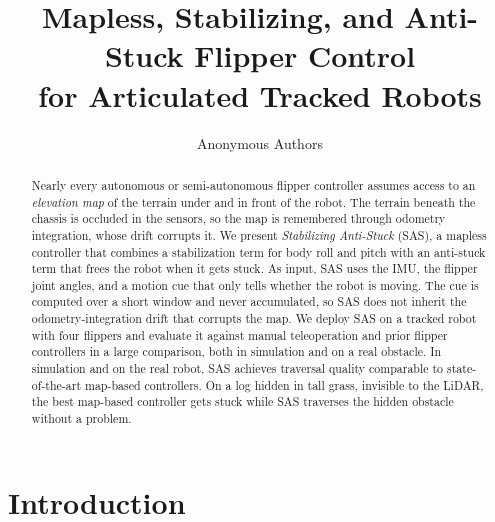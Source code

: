 \documentclass[letterpaper, 10pt, conference]{ieeeconf}
\newcommand{\SAS}{SAS}                    %
\begin{document}
\title{Mapless, Stabilizing, and Anti-Stuck Flipper Control\\ for Articulated Tracked Robots}

\author{Anonymous Authors}

\maketitle

\begin{abstract}
Nearly every autonomous or semi-autonomous flipper controller assumes access
to an \emph{elevation map} of the terrain under and in front of the robot. The terrain beneath the chassis is occluded in the sensors, so the map is remembered through odometry integration, whose drift corrupts it. We present
\emph{Stabilizing Anti-Stuck} (\SAS),
a mapless controller that combines a stabilization term for body roll
and pitch with an anti-stuck term that frees the robot when it gets stuck. As input, \SAS{} uses the IMU, the flipper joint angles, and a motion cue that only
tells whether the robot is moving. The cue is computed over a short window and never
accumulated, so \SAS{} does not inherit the odometry-integration drift that corrupts the
map. We deploy \SAS{} on a tracked robot with four flippers and evaluate it against manual
teleoperation and prior flipper controllers in a large comparison, both in
simulation and on a real obstacle. In simulation and on the real robot, \SAS{} achieves traversal quality comparable to state-of-the-art
map-based controllers. On a log hidden in tall grass, invisible to the LiDAR, the best map-based controller gets stuck
while \SAS{} traverses the hidden obstacle without a problem.
\end{abstract}

\section{Introduction}


\end{document}
